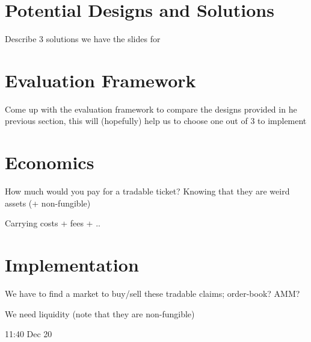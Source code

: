 \section{Potential Designs and Solutions}
	Describe 3 solutions we have the slides for 

\section{Evaluation Framework}
	Come up with the evaluation framework to compare the designs provided in he previous section, this will (hopefully) help us to choose one out of 3 to implement

\section{Economics}
	How much would you pay for a tradable ticket? Knowing that they are weird assets (+ non-fungible)\par
 Carrying costs + fees + ..


\section{Implementation}

 We have to find a market to buy/sell these tradable claims; order-book? AMM? \par
 We need liquidity (note that they are non-fungible)



11:40
Dec 20




